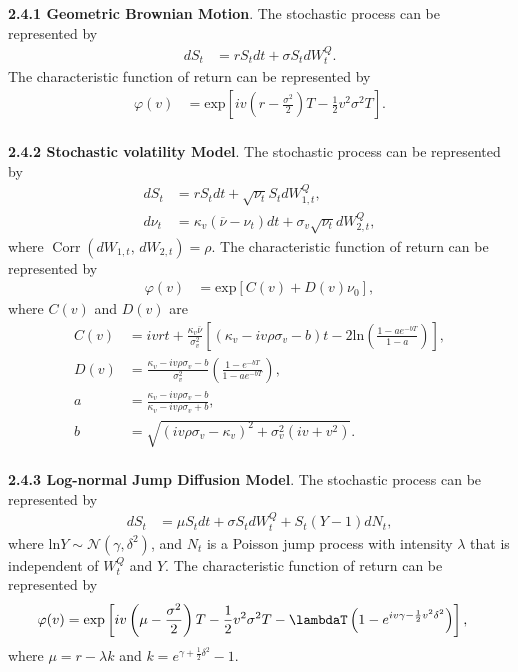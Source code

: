 \noindent\textbf{2.4.1 Geometric Brownian Motion}. 
The stochastic process can be represented by
\begin{align*}
    d S_t & = r S_t d t+ \sigma S_t d W_t^Q.
\end{align*}
The characteristic function of return can be represented by
\begin{align*}
\varphi(v) & =\mathrm{exp} \left[iv\left(r-\frac{\sigma^2}{2}\right)T-\frac{1}{2}v^2 \sigma^2 T \right]. \\
\end{align*}





\noindent\textbf{2.4.2 Stochastic volatility Model}. 
The stochastic process can be represented by 
\begin{align*}
    d S_t & = r S_t d t+\sqrt{\nu_t} S_t d W_{1, t}^Q, \\
    d \nu_t & = \kappa_v\left(\overline{\nu}-\nu_t\right) d t+\sigma_v \sqrt{\nu_t} d W_{2, t}^Q,
\end{align*}
where $\operatorname{Corr}\left(d W_{1, t}, \, d W_{2, t}\right)=\rho$. The characteristic function of return can be represented by
\begin{align*}
\varphi(v) & =\mathrm{exp} \left[C(v)+D(v) \nu_0\right],
\end{align*}
where $C(v)$ and $D(v)$ are
\begin{align*}
C(v) & =i v r t+\frac{\kappa_v \overline{\nu}}{\sigma_v^2}\left[(\kappa_v-i v \rho \sigma_v-b) t-2 \mathrm{ln} \left(\frac{1-a e^{-b T}}{1-a}\right)\right], \\
D(v) & =\frac{\kappa_v-i v \rho \sigma_v-b}{\sigma_v^2}\left(\frac{1-e^{-b T}}{1-a e^{-b T}}\right), \\
a & =\frac{\kappa_v-i v \rho \sigma_v-b}{\kappa_v-i v \rho \sigma_v+b}, \\
b & =\sqrt{(i v \rho \sigma_v-\kappa_v)^2+\sigma_v^2\left(i v+v^2\right)}. \\
\end{align*}



\noindent\textbf{2.4.3 Log-normal Jump Diffusion Model}.
The stochastic process can be represented by
\begin{align*}
    d S_t & = \mu S_t d t+\sigma S_t d W_t^Q+S_t(Y-1) d N_t,
\end{align*}
where $\mathrm{ln} Y \sim \mathcal{N}\left(\gamma, \delta^{2}\right)$, and $N_t$ is a Poisson jump process with intensity $\lambda$ that is independent of $W_t^Q$ and $Y$. The characteristic function of return can be represented by
\begin{align*}
\varphi(v) & =\mathrm{exp} \left[iv\left(\mu - \frac{\sigma^2}{2}\right)T - \frac{1}{2}v^2\sigma^2T-\lambdaT\left(1- e^{iv\gamma-\frac{1}{2}v^2\delta^2}\right)\right],
\end{align*}
where $\mu = r - \lambda k$ and $ k = e^{\gamma+\frac{1}{2} \delta^2}-1$. \\


